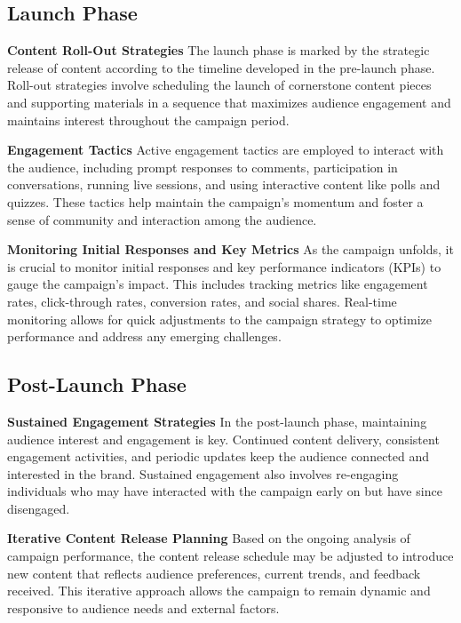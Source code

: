\documentclass[
]{book}
\begin{document}
\hypertarget{launch-phase}{%
\subsection*{Launch Phase}\label{launch-phase}}

\textbf{Content Roll-Out Strategies}
The launch phase is marked by the strategic release of content according to the timeline developed in the pre-launch phase. Roll-out strategies involve scheduling the launch of cornerstone content pieces and supporting materials in a sequence that maximizes audience engagement and maintains interest throughout the campaign period.

\textbf{Engagement Tactics}
Active engagement tactics are employed to interact with the audience, including prompt responses to comments, participation in conversations, running live sessions, and using interactive content like polls and quizzes. These tactics help maintain the campaign's momentum and foster a sense of community and interaction among the audience.

\textbf{Monitoring Initial Responses and Key Metrics}
As the campaign unfolds, it is crucial to monitor initial responses and key performance indicators (KPIs) to gauge the campaign's impact. This includes tracking metrics like engagement rates, click-through rates, conversion rates, and social shares. Real-time monitoring allows for quick adjustments to the campaign strategy to optimize performance and address any emerging challenges.

\hypertarget{post-launch-phase}{%
\subsection*{Post-Launch Phase}\label{post-launch-phase}}

\textbf{Sustained Engagement Strategies}
In the post-launch phase, maintaining audience interest and engagement is key. Continued content delivery, consistent engagement activities, and periodic updates keep the audience connected and interested in the brand. Sustained engagement also involves re-engaging individuals who may have interacted with the campaign early on but have since disengaged.

\textbf{Iterative Content Release Planning}
Based on the ongoing analysis of campaign performance, the content release schedule may be adjusted to introduce new content that reflects audience preferences, current trends, and feedback received. This iterative approach allows the campaign to remain dynamic and responsive to audience needs and external factors.
\end{document}

